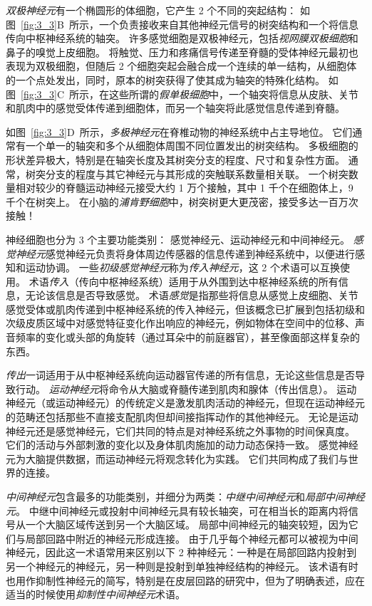 \textit{双极神经元}有一个椭圆形的体细胞，它产生 2 个不同的突起结构：
如图~\ref{fig:3_3}B~所示，一个负责接收来自其他神经元信号的树突结构和一个将信息传向中枢神经系统的轴突。
许多感觉细胞是双极神经元，包括\textit{视网膜双极细胞}和鼻子的嗅觉上皮细胞。
将触觉、压力和疼痛信号传递至脊髓的受体神经元最初也表现为双极细胞，但随后 2 个细胞突起会融合成一个连续的单一结构，从细胞体的一个点处发出，同时，原本的树突获得了使其成为轴突的特殊化结构。
如图~\ref{fig:3_3}C~所示，在这些所谓的\textit{假单极细胞}中，一个轴突将信息从皮肤、关节和肌肉中的感觉受体传递到细胞体，而另一个轴突将此感觉信息传递到脊髓。


如图~\ref{fig:3_3}D~所示，\textit{多极神经元}在脊椎动物的神经系统中占主导地位。 
它们通常有一个单一的轴突和多个从细胞体周围不同位置发出的树突结构。
多极细胞的形状差异极大，特别是在轴突长度及其树突分支的程度、尺寸和复杂性方面。 
通常，树突分支的程度与其它神经元与其形成的突触联系数量相关联。 
一个树突数量相对较少的脊髓运动神经元接受大约 1 万个接触，其中 1 千个在细胞体上，9 千个在树突上。
在小脑的\textit{浦肯野细胞}中，树突树更大更茂密，接受多达一百万次接触！


神经细胞也分为 3 个主要功能类别：
感觉神经元、运动神经元和中间神经元。 
\textit{感觉神经元}感觉神经元负责将身体周边传感器的信息传递到神经系统中，以便进行感知和运动协调。
一些\textit{初级感觉神经元}称为\textit{传入神经元}，这 2 个术语可以互换使用。
术语\textit{传入}（传向中枢神经系统）适用于从外围到达中枢神经系统的所有信息，无论该信息是否导致感觉。
术语\textit{感觉}是指那些将信息从感觉上皮细胞、关节感觉受体或肌肉传递到中枢神经系统的传入神经元，但该概念已扩展到包括初级和次级皮质区域中对感觉特征变化作出响应的神经元，例如物体在空间中的位移、声音频率的变化或头部的角旋转（通过耳朵中的前庭器官），甚至像面部这样复杂的东西。


\textit{传出}一词适用于从中枢神经系统向运动器官传递的所有信息，无论这些信息是否导致行动。
\textit{运动神经元}将命令从大脑或脊髓传递到肌肉和腺体（传出信息）。 
运动神经元（或运动神经元）的传统定义是激发肌肉活动的神经元，但现在运动神经元的范畴还包括那些不直接支配肌肉但却间接指挥动作的其他神经元。
无论是运动神经元还是感觉神经元，它们共同的特点是对神经系统之外事物的时间保真度。
它们的活动与外部刺激的变化以及身体肌肉施加的动力动态保持一致。	
感觉神经元为大脑提供数据，而运动神经元将观念转化为实践。 
它们共同构成了我们与世界的连接。


\textit{中间神经元}包含最多的功能类别，并细分为两类：\textit{中继中间神经元}和\textit{局部中间神经元}。
中继中间神经元或投射中间神经元具有较长轴突，可在相当长的距离内将信号从一个大脑区域传送到另一个大脑区域。
局部中间神经元的轴突较短，因为它们与局部回路中附近的神经元形成连接。
由于几乎每个神经元都可以被视为中间神经元，因此这一术语常用来区别以下 2 种神经元：一种是在局部回路内投射到另一个神经元的神经元，另一种则是投射到单独神经结构的神经元。
该术语有时也用作抑制性神经元的简写，特别是在皮层回路的研究中，但为了明确表述，应在适当的时候使用\textit{抑制性中间神经元}术语。


